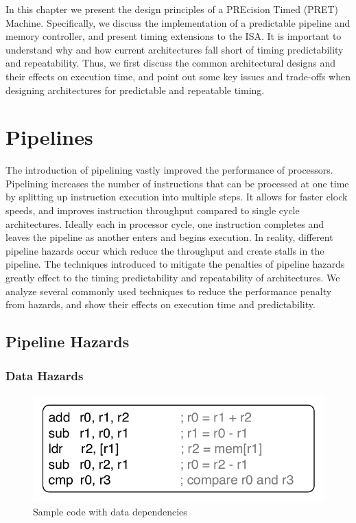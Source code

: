 In this chapter we present the design principles of a PREcision Timed (PRET) Machine.
Specifically, we discuss the implementation of a predictable pipeline and memory controller, and present timing extensions to the ISA. 
It is important to understand why and how current architectures fall short of timing predictability and repeatability.
Thus, we first discuss the common architectural designs and their effects on execution time, and point out some key issues and trade-offs when designing architectures for predictable and repeatable timing.

\section{Pipelines}
The introduction of pipelining vastly improved the performance of processors.
Pipelining increases the number of instructions that can be processed at one time by splitting up instruction execution into multiple steps.
It allows for faster clock speeds, and improves instruction throughput compared to single cycle architectures.
Ideally each in processor cycle, one instruction completes and leaves the pipeline as another enters and begins execution. 
In reality, different pipeline hazards occur which reduce the throughput and create stalls in the pipeline.
The techniques introduced to mitigate the penalties of pipeline hazards greatly effect to the timing predictability and repeatability of architectures.     
We analyze several commonly used techniques to reduce the performance penalty from hazards, and show their effects on execution time and predictability. 

\subsection{Pipeline Hazards}
\label{sec:pipeline_hazards}
\subsubsection{Data Hazards}

\begin{figure}
  \vspace{-30pt}
  \begin{center}
    \includegraphics[scale=.65]{figs/sample_data_dependent_code}
  \end{center}
  \vspace{-3mm}
  \caption{Sample code with data dependencies}
  \label{fig:sample_data_dependent_code}
\end{figure}

